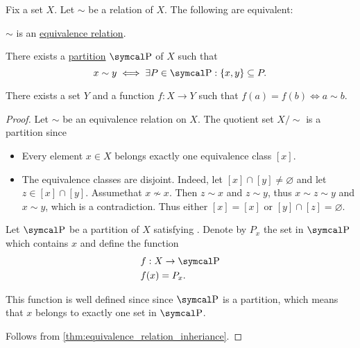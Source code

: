 \begin{proposition}\label{thm:equivalence_partition}
  Fix a set \( X \). Let \( \sim \) be a relation of \( X \). The following are equivalent:
  \begin{defenum}
     \( \sim \) is an \hyperref[def:equivalence_relation]{equivalence relation}.

     There exists a \hyperref[def:set_partition]{partition} \( \CP \) of \( X \) such that
    \begin{equation}\label{thm:equivalence_partition/partition/property}
      x \sim y \iff \exists P \in \CP: \{ x, y \} \subseteq P.
    \end{equation}

     There exists a set \( Y \) and a function \( f: X \to Y \) such that \( f(a) = f(b) \iff a \sim b \).
  \end{defenum}
\end{proposition}
\begin{proof}
   Let \( \sim \) be an equivalence relation on \( X \). The quotient set \( X / \sim \) is a partition since
  \begin{itemize}
    \item Every element \( x \in X \) belongs exactly one equivalence class \( [x] \).
    \item The equivalence classes are disjoint. Indeed, let \( [x] \cap [y] \neq \varnothing \) and let \( z \in [x] \cap [y] \). Assume\LEM that \( x \not\sim x \). Then \( z \sim x \) and \( z \sim y \), thus \( x \sim z \sim y \) and \( x \sim y \), which is a contradiction. Thus either \( [x] = [x] \) or \( [y] \cap [z] = \varnothing \).
  \end{itemize}

   Let \( \CP \) be a partition of \( X \) satisfying . Denote by \( P_x \) the set in \( \CP \) which contains \( x \) and define the function
  \begin{align*}
    &f: X \to \CP \\
    &f(x) = P_x.
  \end{align*}

  This function is well defined since since \( \CP \) is a partition, which means that \( x \) belongs to exactly one set in \( \CP \).

   Follows from \cref{thm:equivalence_relation_inheriance}.
\end{proof}
